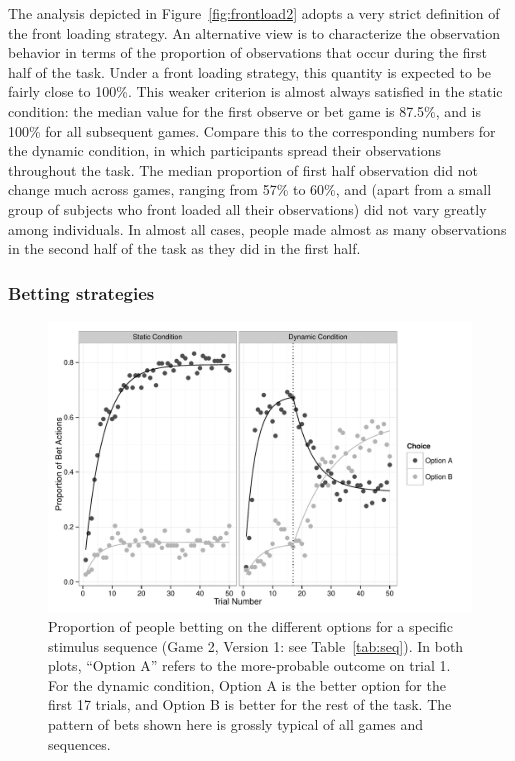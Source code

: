 \documentclass[authoryear]{elsarticle}
\newcommand{\subsubsectionX}[1]{\subsubsection{#1}}
\begin{document}
The analysis depicted in Figure~\ref{fig:frontload2} adopts a very strict definition of the front loading strategy. An alternative view is to characterize the observation behavior in terms of the proportion of observations that occur during the first half of the task. Under a front loading strategy, this quantity is expected to be fairly close to 100\%. This weaker criterion is almost always satisfied in the static condition: the median value for the first observe or bet game is 87.5\%, and is 100\% for all subsequent games. Compare this to the corresponding numbers for the dynamic condition, in which participants spread their observations throughout the task. The median proportion of first half observation did not change much across games, ranging from 57\% to 60\%, and (apart from a small group of subjects who front loaded all their observations) did not vary greatly among individuals. In almost all cases, people made almost as many observations in the second half of the task as they did in the first half.



\subsubsectionX{Betting strategies}

\begin{figure}[t]
\begin{center}
\includegraphics[scale=.5]{bettingExample.pdf}
\caption{Proportion of people betting on the different options for a specific stimulus sequence (Game 2, Version 1: see Table~\ref{tab:seq}). In both plots, ``Option A'' refers to the more-probable outcome on trial 1. For the dynamic condition, Option A is the better option for the first 17 trials, and Option B is better for the rest of the task. The pattern of bets shown here is grossly typical of all games and sequences.}
\label{fig:bettingExample}
\end{center}
\end{figure}
\end{document}
